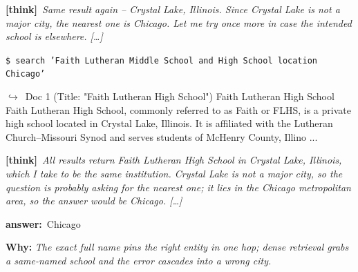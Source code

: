 \documentclass{article} %
\newcommand{\winbadge}{\colorbox{green!50!black}{\textcolor{white}{\scriptsize\bfseries\,WIN\,}}}
\newcommand{\thk}[1]{{\footnotesize\textcolor{violet!75!black}{\textbf{[think]}}\ \textit{#1}\par}}
\newcommand{\cmd}[1]{{\footnotesize\texttt{\textcolor{blue!35!black}{\$\ #1}}\par}}
\newcommand{\retr}[1]{{\footnotesize\textcolor{black!65}{\quad$\hookrightarrow$\ #1}\par}}
\newcommand{\ans}[1]{{\footnotesize\textbf{answer:}\ #1\par}}
\begin{document}
\begin{cmpbox}[label={ex:hotpot-faithlutheran},title={\winbadge\ \ \textsc{HotpotQA -- name-collision disambiguation}}]
  \thk{Same result again -- Crystal Lake, Illinois. Since Crystal Lake is not a major city, the nearest one is Chicago. Let me try once more in case the intended school is elsewhere. […]}
  \cmd{search 'Faith Lutheran Middle School and High School location Chicago'}
  \retr{Doc 1 (Title: "Faith Lutheran High School") Faith Lutheran High School Faith Lutheran High School, commonly referred to as Faith or FLHS, is a private high school located in Crystal Lake, Illinois. It is affiliated with the Lutheran Church–Missouri Synod and serves students of McHenry County, Illino ...}
  \thk{All results return Faith Lutheran High School in Crystal Lake, Illinois, which I take to be the same institution. Crystal Lake is not a major city, so the question is probably asking for the nearest one; it lies in the Chicago metropolitan area, so the answer would be Chicago. […]}
  \ans{Chicago}
\smallskip\par\textbf{Why:} \textit{The exact full name pins the right entity in one hop; dense retrieval grabs a same-named school and the error cascades into a wrong city.}
\end{cmpbox}\bigskip
\end{document}
